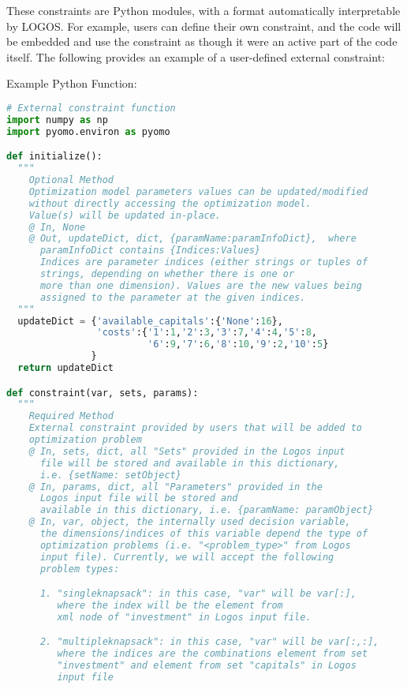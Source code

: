 These constraints are Python modules, with a format automatically interpretable by
LOGOS. For example, users can define their own constraint, and the code will be embedded
and use the constraint as though it were an active part of the code itself.
The following provides an example of a user-defined external constraint:

Example Python Function:
\begin{lstlisting}[language=python]
# External constraint function
import numpy as np
import pyomo.environ as pyomo

def initialize():
  """
    Optional Method
    Optimization model parameters values can be updated/modified
    without directly accessing the optimization model.
    Value(s) will be updated in-place.
    @ In, None
    @ Out, updateDict, dict, {paramName:paramInfoDict},  where
      paramInfoDict contains {Indices:Values}
      Indices are parameter indices (either strings or tuples of
      strings, depending on whether there is one or
      more than one dimension). Values are the new values being
      assigned to the parameter at the given indices.
  """
  updateDict = {'available_capitals':{'None':16},
                'costs':{'1':1,'2':3,'3':7,'4':4,'5':8,
                         '6':9,'7':6,'8':10,'9':2,'10':5}
               }
  return updateDict

def constraint(var, sets, params):
  """
    Required Method
    External constraint provided by users that will be added to
    optimization problem
    @ In, sets, dict, all "Sets" provided in the Logos input
      file will be stored and available in this dictionary,
      i.e. {setName: setObject}
    @ In, params, dict, all "Parameters" provided in the
      Logos input file will be stored and
      available in this dictionary, i.e. {paramName: paramObject}
    @ In, var, object, the internally used decision variable,
      the dimensions/indices of this variable depend the type of
      optimization problems (i.e. "<problem_type>" from Logos
      input file). Currently, we will accept the following
      problem types:

      1. "singleknapsack": in this case, "var" will be var[:],
         where the index will be the element from
         xml node of "investment" in Logos input file.

      2. "multipleknapsack": in this case, "var" will be var[:,:],
         where the indices are the combinations element from set
         "investment" and element from set "capitals" in Logos
         input file


\end{lstlisting}
